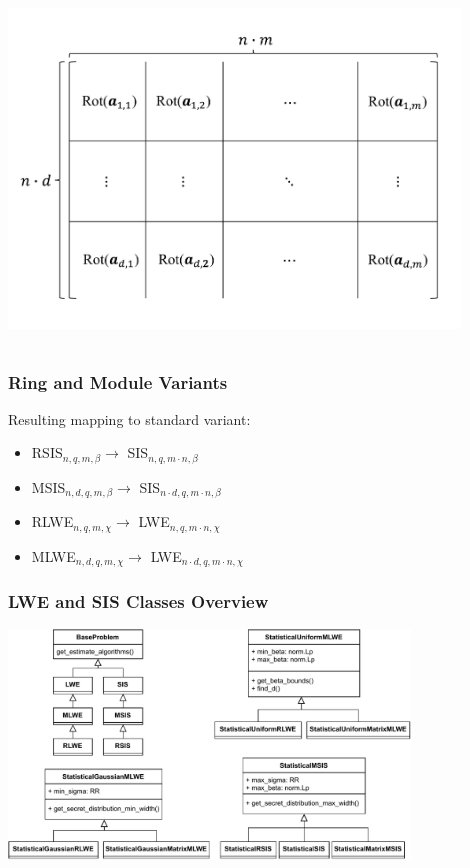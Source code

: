 \documentclass[t, aspectratio=169]{beamer}
\begin{document}
\begin{frame}
\begin{columns}
\begin{column}{0.5\textwidth}
\begin{center}
                \includegraphics[width=0.9\textwidth]{../thesis/graphics/MSIS_matrix.pdf}
            \end{center}

        \end{column}
    \end{columns}
\end{frame}
\begin{frame}
    \frametitle{Ring and Module Variants}
    Resulting mapping to standard variant:
    \begin{itemize}[<+->]
        \item RSIS$_{n, q, m, \beta} \longrightarrow$ SIS$_{n, q, m \cdot n, \beta}$
        \item MSIS$_{n, d, q, m, \beta} \longrightarrow$ SIS$_{n \cdot d, q, m \cdot n, \beta}$
        \item RLWE$_{n, q, m, \chi} \longrightarrow$ LWE$_{n, q, m \cdot n, \chi}$
        \item MLWE$_{n, d, q, m, \chi} \longrightarrow$ LWE$_{n \cdot d, q, m \cdot n, \chi}$
    \end{itemize}
\end{frame}
\begin{frame}
    \frametitle{LWE and SIS Classes Overview}
    \centering
    \includegraphics[width=0.8\textwidth]{../thesis/graphics/problem_classes.pdf}
\end{frame}
\end{document}
